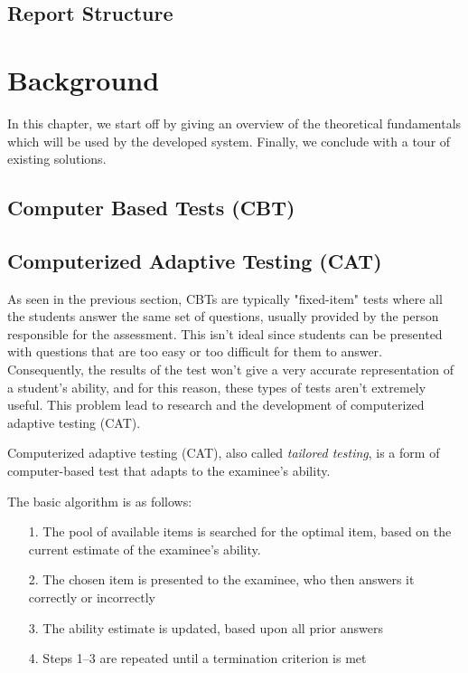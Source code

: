 \documentclass[11pt,a4paper]{report}
\begin{document}
\section{Report Structure}



\chapter{Background}
In this chapter, we start off by giving an overview of the theoretical fundamentals which will be used by the developed system. Finally, we conclude with a tour of existing solutions.

\section{Computer Based Tests (CBT)}

\section{Computerized Adaptive Testing (CAT)}
As seen in the previous section, CBTs are typically "fixed-item" tests where all the students answer the same set of questions,  usually provided by the person responsible for the assessment. This isn't ideal since students can be presented with questions that are too easy or too difficult for them to answer. Consequently, the results of the test won't give a very accurate representation of a student's ability, and for this reason, these types of tests aren't extremely useful. This problem lead to research and the development of computerized adaptive testing (CAT). \newline

Computerized adaptive testing (CAT), also called \textit{tailored testing}, is a form of computer-based test that adapts to the examinee's ability. \newline

The basic algorithm is as follows:
\begin{itemize}
\item[1.] The pool of available items is searched for the optimal item, based on the current estimate of the examinee's ability.
\item[2.] The chosen item is presented to the examinee, who then answers it correctly or incorrectly
\item[3.] The ability estimate is updated, based upon all prior answers
\item[4.] Steps 1–3 are repeated until a termination criterion is met
\end{itemize}
\end{document}
